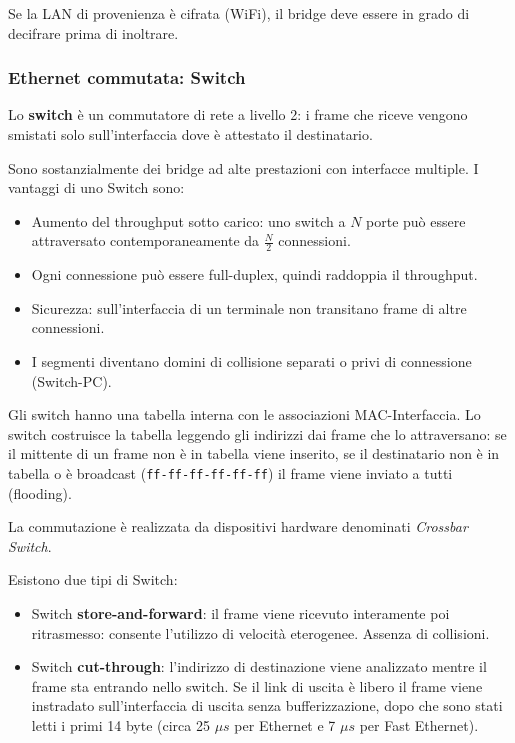             Se la LAN di provenienza è cifrata (WiFi), il bridge deve essere in grado di decifrare prima di inoltrare.

        \subsubsection{Ethernet commutata: Switch}
            Lo \textbf{switch} è un commutatore di rete a livello 2: i frame che riceve vengono smistati solo sull'interfaccia dove è attestato il destinatario.
            
            Sono sostanzialmente dei bridge ad alte prestazioni con interfacce multiple. I vantaggi di uno Switch sono:
            \begin{itemize}
                \item Aumento del throughput sotto carico: uno switch a $N$ porte può essere attraversato contemporaneamente da $\frac{N}{2}$ connessioni.
                \item Ogni connessione può essere full-duplex, quindi raddoppia il throughput.
                \item Sicurezza: sull'interfaccia di un terminale non transitano frame di altre connessioni.
                \item I segmenti diventano domini di collisione separati o privi di connessione (Switch-PC).
            \end{itemize}

            Gli switch hanno una tabella interna con le associazioni MAC-Interfaccia. Lo switch costruisce la tabella leggendo gli indirizzi dai frame che lo attraversano: se il mittente di un frame non è in tabella viene inserito, se il destinatario non è in tabella o è broadcast (\texttt{ff-ff-ff-ff-ff-ff}) il frame viene inviato a tutti (flooding).

            La commutazione è realizzata da dispositivi hardware denominati \textit{Crossbar Switch}.

            Esistono due tipi di Switch:
            \begin{itemize}
                \item Switch \textbf{store-and-forward}: il frame viene ricevuto interamente poi ritrasmesso: consente l'utilizzo di velocità eterogenee. Assenza di collisioni.
                \item Switch \textbf{cut-through}: l'indirizzo di destinazione viene analizzato mentre il frame sta entrando nello switch. Se il link di uscita è libero il frame viene instradato sull'interfaccia di uscita senza bufferizzazione, dopo che sono stati letti i primi 14 byte (circa 25 $\mu s$ per Ethernet e 7 $\mu s$ per Fast Ethernet).
            \end{itemize}

